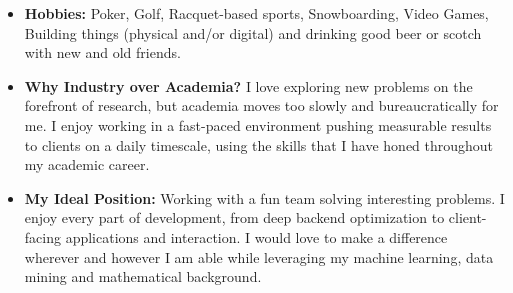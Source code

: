 \documentclass[letterpaper,11pt]{article}
\begin{document}
\begin{itemize}

\item {\bf Hobbies:} Poker, Golf, Racquet-based sports, Snowboarding, Video Games, Building things (physical and/or digital) and drinking good beer or scotch with new and old friends.

\item {\bf Why Industry over Academia?} I love exploring new problems on the forefront of research, but academia moves too slowly and bureaucratically for me. I enjoy working in a fast-paced environment pushing measurable results to clients on a daily timescale, using the skills that I have honed throughout my academic career.

\item {\bf My Ideal Position:} Working with a fun team solving interesting problems. I enjoy every part of development, from deep backend optimization to client-facing applications and interaction. I would love to make a difference wherever and however I am able while leveraging my machine learning, data mining and mathematical background.

\end{itemize}
\end{document}
